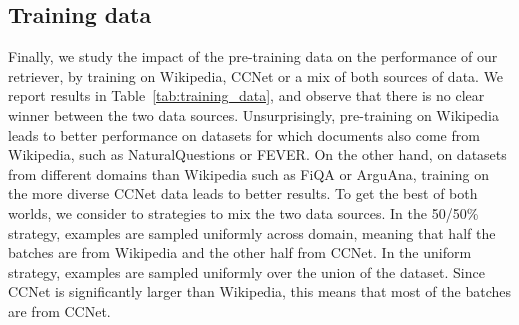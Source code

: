 
\subsection{Training data}
Finally, we study the impact of the pre-training data on the performance of our retriever, by training on Wikipedia, CCNet or a mix of both sources of data.
We report results in Table~\ref{tab:training_data}, and observe that there is no clear winner between the two data sources.
Unsurprisingly, pre-training on Wikipedia leads to better performance on datasets for which documents also come from Wikipedia, such as NaturalQuestions or FEVER.
On the other hand, on datasets from different domains than Wikipedia such as FiQA or ArguAna, training on the more diverse CCNet data leads to better results.
To get the best of both worlds, we consider to strategies to mix the two data sources.
In the 50/50\% strategy, examples are sampled uniformly across domain, meaning that half the batches are from Wikipedia and the other half from CCNet.
In the uniform strategy, examples are sampled uniformly over the union of the dataset.
Since CCNet is significantly larger than Wikipedia, this means that most of the batches are from CCNet.

